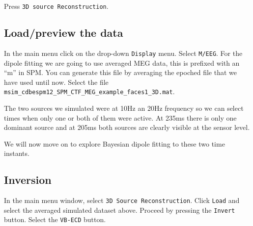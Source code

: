 Press  \texttt{3D source Reconstruction}.

\subsection{Load/preview the data}

In the main menu click on the drop-down \texttt{Display} menu. Select \texttt{M/EEG}. For the dipole fitting we are going to use averaged MEG data, this is prefixed with an ``m'' in SPM. You can generate this file by averaging the epoched file that we have used until now. Select the file \texttt{msim\_cdbespm12\_SPM\_CTF\_MEG\_example\_faces1\_3D.mat}.

The two sources we simulated were at 10Hz an 20Hz frequency so we can select times when only one or both of them were active.  At 235ms there is only one dominant source and at 205ms both sources are clearly visible at the sensor level.

We will now move on to explore Bayesian dipole fitting to these two time instants.

\subsection{Inversion}
In the main menu window, select \texttt{3D Source Reconstruction}. Click \texttt{Load} and select the averaged simulated dataset above.
Proceed by pressing the \texttt{Invert} button. Select the \texttt{VB-ECD} button.

